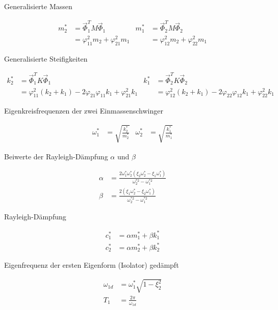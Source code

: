 Generalisierte Massen

\begin{align*}
m_2^* &= \vec{\Phi}_1^T M \vec{\Phi}_1               &   m_1^* &= \vec{\Phi}_2^T M \vec{\Phi}_2\\
      &= \varphi_{11}^2 m_2 + \varphi_{21}^2 m_1     &         &= \varphi_{12}^2 m_2 + \varphi_{22}^2 m_1
\end{align*}

Generalisierte Steifigkeiten

\begin{align*}
k_2^* &= \vec{\Phi}_1^T K \vec{\Phi}_1                                                          &   k_1^* &= \vec{\Phi}_2^T K \vec{\Phi}_2\\
      &= \varphi_{11}^2 (k_2 + k_1) - 2 \varphi_{21} \varphi_{11} k_1 + \varphi_{21}^2 k_1      &         &= \varphi_{12}^2 (k_2 + k_1) - 2 \varphi_{22} \varphi_{12} k_1 + \varphi_{22}^2 k_1
\end{align*}

Eigenkreisfrequenzen der zwei Einmassenschwinger

\begin{align*}
\omega_1^* &= \sqrt{\frac{k_2^*}{m_2^*}}  &  \omega_2^* &= \sqrt{\frac{k_1^*}{m_1^*}}
\end{align*}

Beiwerte der Rayleigh-Dämpfung $\alpha$ und $\beta$ 

\begin{align*}
\alpha &= \frac{2 \omega_1^* \omega_2^* (\xi_2 \omega_2^* - \xi_1 \omega_1^*)}{\omega_2^{*2} - \omega_1^{*2}}\\
\beta  &= \frac{2 (\xi_1 \omega_2^* - \xi_2 \omega_1^*)}{\omega_2^{*2} - \omega_1^{*2}}
\end{align*}

Rayleigh-Dämpfung

\begin{align*}
c_1^* &= \alpha m_1^* + \beta k_1^*\\
c_2^* &= \alpha m_2^* + \beta k_2^*
\end{align*}





Eigenfrequenz der ersten Eigenform (Isolator) gedämpft


\begin{align*}
\omega_{1d} &= \omega_1^* \sqrt{1 - \xi_2^2}\\
T_1         &= \frac{2 \pi}{\omega_{1d}} 
\end{align*}


